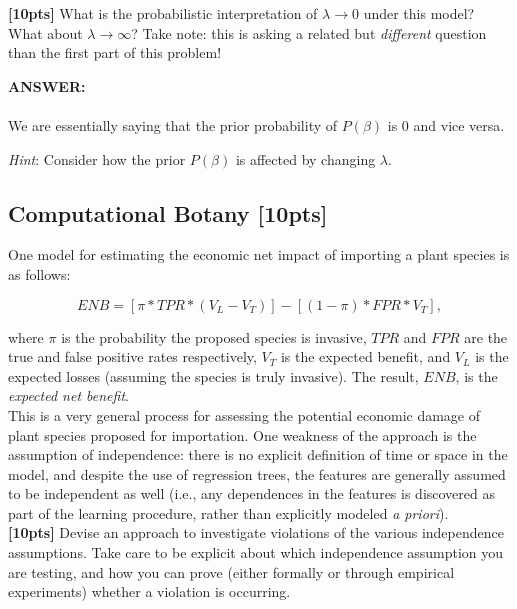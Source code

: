 \documentclass[paper=a4, fontsize=11pt]{scrartcl} %
\numberwithin{figure}{section} %
\numberwithin{table}{section} %
\begin{document}
\textbf{[10pts]} What is the probabilistic interpretation of $\lambda \rightarrow 0$ under this model? What about $\lambda \rightarrow \infty$? Take note: this is asking a related but \emph{different} question than the first part of this problem! \\
\begin{addmargin}[2em]{2em}
  \textbf{ANSWER:}\\\\
  We are essentially saying that the prior probability of $P(\beta)$ is 0 and vice versa.
  \\
\end{addmargin}

\emph{Hint}: Consider how the prior $P(\beta)$ is affected by changing $\lambda$. \\


\subsection{Computational Botany \textbf{[10pts]}}

One model for estimating the economic net impact of importing a plant species is as follows:

$$
ENB = \left[ \pi * TPR * (V_L - V_T) \right] - \left[ (1 - \pi) * FPR * V_T \right],
$$

where $\pi$ is the probability the proposed species is invasive, $TPR$ and $FPR$ are the true and false positive rates respectively, $V_T$ is the expected benefit, and $V_L$ is the expected losses (assuming the species is truly invasive). The result, $ENB$, is the \emph{expected net benefit}. \\

This is a very general process for assessing the potential economic damage of plant species proposed for importation. One weakness of the approach is the assumption of independence: there is no explicit definition of time or space in the model, and despite the use of regression trees, the features are generally assumed to be independent as well (i.e., any dependences in the features is discovered as part of the learning procedure, rather than explicitly modeled \emph{a priori}). \\

\textbf{[10pts]} Devise an approach to investigate violations of the various independence assumptions. Take care to be explicit about which independence assumption you are testing, and how you can prove (either formally or through empirical experiments) whether a violation is occurring. \\
\end{document}
